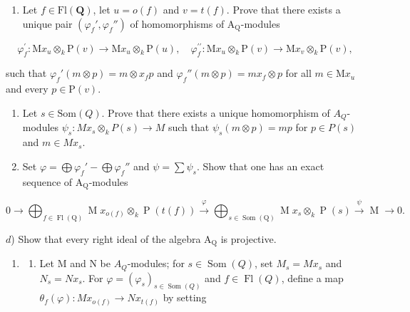 \begin{enumerate}
\def\labelenumi{\alph{enumi})}
\tightlist
\item
  Let \(f \in \mathrm{Fl}(\mathbf{Q})\), let \(u = o(f)\) and \(v = t(f)\). Prove that there exists a unique pair \((\varphi_f', \varphi_f'')\) of homomorphisms of \(\mathrm{A}_{\mathrm{Q}}\)-modules
\end{enumerate}

\[
\varphi_ {f} ^ {\prime} \colon \mathrm{M} x _ {u} \otimes_ {k} \mathrm{P} (v) \to \mathrm{M} x _ {u} \otimes_ {k} \mathrm{P} (u), \quad \varphi_ {f} ^ {\prime \prime} \colon \mathrm{M} x _ {u} \otimes_ {k} \mathrm{P} (v) \to \mathrm{M} x _ {v} \otimes_ {k} \mathrm{P} (v),
\]

 such that \(\varphi_f'(m \otimes p) = m \otimes x_f p\) and \(\varphi_f''(m \otimes p) = mx_f \otimes p\) for all \(m \in \mathrm{M}x_u\) and every \(p \in \mathrm{P}(v)\).

\begin{enumerate}
\def\labelenumi{\alph{enumi})}
\setcounter{enumi}{1}
\item
  Let \(s \in \text{Som}(Q)\). Prove that there exists a unique homomorphism of \(A_{Q}\)-modules \(\psi_{s}: Mx_{s} \otimes_{k} P(s) \to M\) such that \(\psi_{s}(m \otimes p) = mp\) for \(p \in P(s)\) and \(m \in Mx_{s}\).
\item
  Set \(\varphi = \bigoplus \varphi_f' - \bigoplus \varphi_f''\) and \(\psi = \sum \psi_s\). Show that one has an exact sequence of \(\mathrm{A}_{\mathrm{Q}}\)-modules
\end{enumerate}

\[
0 \to \bigoplus_ {f \in \operatorname{Fl} (\mathrm{Q})} \operatorname{M} x _ {o (f)} \otimes_ {k} \operatorname{P} (t (f)) \xrightarrow {\varphi} \bigoplus_ {s \in \operatorname{Som} (\mathrm{Q})} \operatorname{M} x _ {s} \otimes_ {k} \operatorname{P} (s) \xrightarrow {\psi} \operatorname{M} \to 0.
\]

\(d\)) Show that every right ideal of the algebra \(\mathrm{A_Q}\) is projective.

\begin{enumerate}
\def\labelenumi{\arabic{enumi})}
\setcounter{enumi}{8}
\tightlist
\item
  \begin{enumerate}
  \def\labelenumii{\alph{enumii})}
  \tightlist
  \item
    Let M and N be \(A_Q\)-modules; for \(s \in \operatorname{Som}(Q)\), set \(M_s=Mx_s\) and \(N_s=Nx_s\). For \(\varphi = (\varphi_s)_{s \in \operatorname{Som}(Q)}\) and \(f \in \operatorname{Fl}(Q)\), define a map \(\theta_f(\varphi): Mx_{o(f)} \to Nx_{t(f)}\) by setting
  \end{enumerate}
\end{enumerate}

